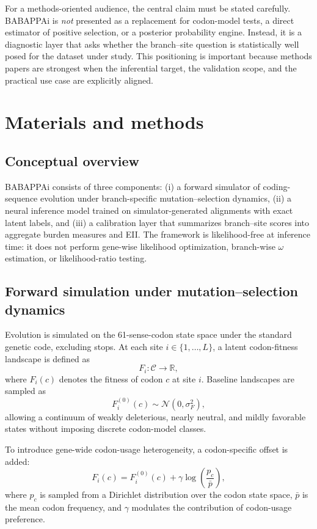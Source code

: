 \documentclass[11pt]{article}
\begin{document}
For a methods-oriented audience, the central claim must be stated carefully. BABAPPAi is \emph{not} presented as a replacement for codon-model tests, a direct estimator of positive selection, or a posterior probability engine. Instead, it is a diagnostic layer that asks whether the branch--site question is statistically well posed for the dataset under study. This positioning is important because methods papers are strongest when the inferential target, the validation scope, and the practical use case are explicitly aligned.

\section{Materials and methods}

\subsection{Conceptual overview}

BABAPPAi consists of three components: (i) a forward simulator of coding-sequence evolution under branch-specific mutation--selection dynamics, (ii) a neural inference model trained on simulator-generated alignments with exact latent labels, and (iii) a calibration layer that summarizes branch--site scores into aggregate burden measures and EII. The framework is likelihood-free at inference time: it does not perform gene-wise likelihood optimization, branch-wise $\omega$ estimation, or likelihood-ratio testing.

\subsection{Forward simulation under mutation--selection dynamics}

Evolution is simulated on the 61-sense-codon state space under the standard genetic code, excluding stops. At each site $i \in \{1,\ldots,L\}$, a latent codon-fitness landscape is defined as
\[
F_i:\mathcal{C}\rightarrow \mathbb{R},
\]
where $F_i(c)$ denotes the fitness of codon $c$ at site $i$. Baseline landscapes are sampled as
\[
F_i^{(0)}(c)\sim \mathcal{N}(0,\sigma_F^2),
\]
allowing a continuum of weakly deleterious, nearly neutral, and mildly favorable states without imposing discrete codon-model classes.

To introduce gene-wide codon-usage heterogeneity, a codon-specific offset is added:
\[
F_i(c)=F_i^{(0)}(c)+\gamma \log\!\left(\frac{p_c}{\bar p}\right),
\]
where $p_c$ is sampled from a Dirichlet distribution over the codon state space, $\bar p$ is the mean codon frequency, and $\gamma$ modulates the contribution of codon-usage preference.
\end{document}
